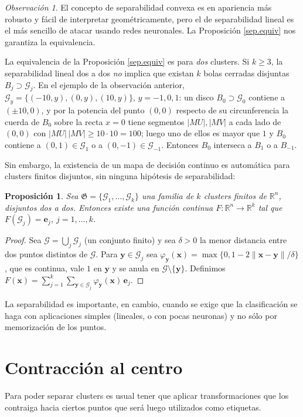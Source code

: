 \documentclass[12pt, a4paper]{amsbook}
\newcommand{\R}{{\mathbb R}}
\newcommand{\G}{{\mathcal G}}
\newcommand{\xx}{{\mathbf x}}
\newcommand{\yy}{{\mathbf y}}
\newcommand{\ee}{{\mathbf e}}
\newcommand{\Gk}{{\mathfrak G}}
\newtheorem{prop}[teo]{Proposici\'on}
\theoremstyle{remark}
\newtheorem{obs}[teo]{Observaci\'on}
\theoremstyle{definition}
\numberwithin{section}{chapter}
\numberwithin{subsection}{section}
\numberwithin{equation}{section}
\numberwithin{figure}{chapter}
\begin{document}
\begin{obs}
El concepto de separabilidad convexa es en apariencia más robusto y fácil de interpretar geométricamente, pero el de separabilidad lineal es el más sencillo de atacar usando redes neuronales. La Proposición \ref{sep.equiv} nos garantiza la equivalencia.
\end{obs}

La equivalencia de la Proposición \ref{sep.equiv} es para {\em dos} clusters. Si $k\ge3$, la separabilidad lineal dos a dos {\em no} implica que existan $k$ bolas cerradas disjuntas $B_j\supset\G_j$. En el ejemplo de la observación anterior, $\G_y=\{(-10,y),(0,y),(10,y)\}$, $y=-1,0,1$: un disco $B_0\supset\G_0$ contiene a $(\pm10,0)$, y por la potencia del punto $(0,0)$ respecto de su circunferencia la cuerda de $B_0$ sobre la recta $x=0$ tiene segmentos $|MU|,|MV|$ a cada lado de $(0,0)$ con $|MU|\,|MV|\ge10\cdot10=100$; luego uno de ellos es mayor que $1$ y $B_0$ contiene a $(0,1)\in\G_1$ o a $(0,-1)\in\G_{-1}$. Entonces $B_0$ interseca a $B_1$ o a $B_{-1}$.

Sin embargo, la existencia de un mapa de decisión continuo es automática para clusters finitos disjuntos, sin ninguna hipótesis de separabilidad:
\begin{prop}
Sea $\Gk = \{\G_1,\dots,\G_k\}$ una familia de $k$ clusters finitos de $\R^n$, disjuntos dos a dos. Entonces existe una función continua $F\colon \R^n\to \R^k$ tal que $F(\G_j)= \ee_j$, $j=1,\dots,k$.
\end{prop}

\begin{proof}
Sea $\G=\bigcup_j\G_j$ (un conjunto finito) y sea $\delta>0$ la menor distancia entre dos puntos distintos de $\G$. Para $\yy\in\G_j$ sea $\varphi_{\yy}(\xx)=\max\{0,1-2\|\xx-\yy\|/\delta\}$, que es continua, vale $1$ en $\yy$ y se anula en $\G\setminus\{\yy\}$. Definimos $F(\xx)=\sum_{j=1}^k\sum_{\yy\in\G_j}\varphi_{\yy}(\xx)\,\ee_j$.
\end{proof}

La separabilidad es importante, en cambio, cuando se exige que la clasificación se haga con aplicaciones simples (lineales, o con pocas neuronas) y no sólo por memorización de los puntos.

\section{Contracción al centro}\label{sec.c10.7}

Para poder separar clusters es usual tener que aplicar transformaciones que los contraiga hacia ciertos puntos que será luego utilizados como etiquetas.
\end{document}

